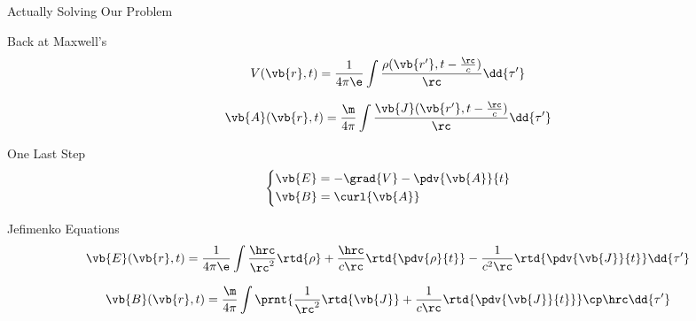    \begin{frame}{Actually Solving Our Problem}
        
    \end{frame}
    
    \begin{frame}{Back at Maxwell's}
        \begin{equation*}
            V(\vb{r},t) = \frac{1}{4 \pi \e} \int \frac{\rho(\vb{r'}, t - \frac{\rc}{c})}{\rc} \dd{\tau'}
        \end{equation*}
        
        \begin{equation*}
            \vb{A}(\vb{r},t) = \frac{\m}{4 \pi} \int \frac{\vb{J}(\vb{r'}, t - \frac{\rc}{c})}{\rc} \dd{\tau'}
        \end{equation*}
    \end{frame}
    
    \begin{frame}{One Last Step} 
        \begin{equation*}
            \left\lbrace
            \begin{aligned}
                &\vb{E} = - \grad{V} - \pdv{\vb{A}}{t} \\
                &\vb{B} = \curl{\vb{A}}
            \end{aligned}
            \right.
        \end{equation*}
    \end{frame}
    
    \begin{frame}{Jefimenko Equations}
        \begin{equation*}
            \vb{E}(\vb{r},t) = \frac{1}{4\pi\e}\int \frac{\hrc}{\rc^2}\rtd{\rho} + \frac{\hrc}{c\rc} \rtd{\pdv{\rho}{t}} - \frac{1}{c^2\rc} \rtd{\pdv{\vb{J}}{t}} \dd{\tau'}
        \end{equation*}
                    
        \begin{equation*}
            \vb{B}(\vb{r},t) = \frac{\m}{4\pi}\int \prnt{\frac{1}{\rc^2} \rtd{\vb{J}} + \frac{1}{c\rc} \rtd{\pdv{\vb{J}}{t}}} \cp \hrc \dd{\tau'}
        \end{equation*}
    \end{frame}
    

